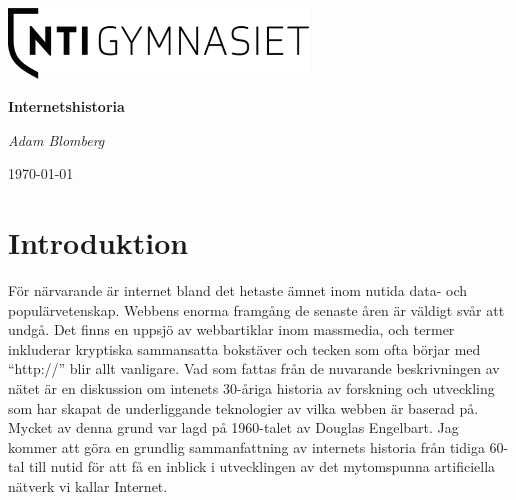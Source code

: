 \documentclass[a4paper,11pt]{article}
\begin{document}
\begin{titlepage}
	\centering
	\includegraphics[width=0.6\textwidth]{Bilder/logo.png}\par\vspace{1cm}
	\vspace{1.5cm}
	{\huge\bfseries Internetshistoria\par}
	\vspace{2cm}
	{\Large\itshape Adam Blomberg\par}
	\vfill
{}
	\vfill

	{\large \today\par}
\end{titlepage}

\tableofcontents
\newpage

\section{Introduktion}
För närvarande är internet bland det hetaste ämnet inom nutida data-
och populärvetenskap. Webbens enorma framgång de senaste åren är väldigt svår
att undgå. Det finns en uppsjö av webbartiklar inom massmedia, och termer
inkluderar kryptiska sammansatta bokstäver och tecken som ofta börjar med
``http://'' blir allt vanligare. Vad som fattas från de nuvarande beskrivningen
av nätet är en diskussion om intenets 30-åriga historia av forskning och
utveckling som har skapat de underliggande teknologier av vilka webben är
baserad på. Mycket av denna grund var lagd på 1960-talet av Douglas Engelbart.
Jag kommer att göra en grundlig sammanfattning av internets historia från tidiga
60-tal till nutid för att få en inblick i utvecklingen av det mytomspunna
artificiella nätverk vi kallar Internet.
\end{document}
